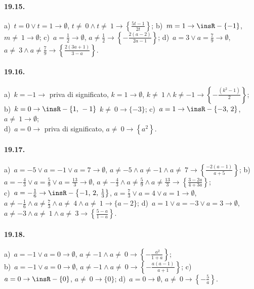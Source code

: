 \paragraph{19.15.}
a)~$t=0\vee t=1 \rightarrow \emptyset$, $t\neq~0\wedge t\neq~1 \rightarrow \left\{\frac{5t-1}{2t}\right\}$;
\quad b)~$m=1 \rightarrow \insR-\{-1\}$, $m\neq~1 \rightarrow \emptyset$;
\quad c)~$a=\frac{1}{2} \rightarrow \emptyset$, $a\neq \frac{1}{2} \rightarrow \left\{-{\frac{2(a-2)}{2a-1}}\right\}$;
\quad d)~$a=3\vee a=\frac{7}{9} \rightarrow \emptyset$, $a\neq~3\wedge a\neq \frac{7}{9} \rightarrow \left\{\frac{2(3a+1)}{3-a}\right\}$.

\paragraph{19.16.}
a)~$k=-1 \rightarrow$ priva di significato, $k=1 \rightarrow \emptyset$, $k\neq~1\wedge k\neq -1 \rightarrow \left\{-{\frac{\left(k^2-1\right)}{2}}\right\}$;
\protect\\ b)~$k=0 \rightarrow \insR-\{1\text{,~}-1\}$ $k\neq~0 \rightarrow \{-3\}$; \quad c)~$a=1 \rightarrow \insR-\{-3\text{,~}2\}$, $a\neq~1 \rightarrow \emptyset$;
\protect\\ d)~$a=0 \rightarrow$ priva di significato, $a\neq~0 \rightarrow \left\{a^{2}\right\}$.

\paragraph{19.17.}
a)~$a=-5\vee a=-1\vee a=7 \rightarrow \emptyset$, $a\neq -5\wedge a\neq -1\wedge a\neq~7 \rightarrow \left\{\frac{-2(a-1)}{a+5}\right\}$;
\quad b)~$a=-{\frac{4}{3}}\vee a=\frac{5}{9}\vee a=\frac{13}{3} \rightarrow \emptyset$, $a\neq -{\frac{4}{3}}\wedge a\neq \frac{5}{9}\wedge a\neq \frac{13}{3} \rightarrow \left\{\frac{3-2a}{4+3a}\right\}$;
\protect\\ c)~$a=-{\frac{1}{6}} \rightarrow \insR-\left\{-1\text{,~}2\text{,~}\frac{1}{3}\right\}$, $a=\frac{7}{3}\vee a=4\vee a=1 \rightarrow \emptyset$, $a\neq -{\frac{1}{6}}\wedge a\neq \frac{7}{3}\wedge a\neq~4\wedge a\neq~1 \rightarrow \{a-2\}$;
\quad d)~$a=1\vee a=-3\vee a=3 \rightarrow \emptyset$, $a\neq -3\wedge a\neq~1\wedge a\neq~3 \rightarrow \left\{\frac{5-a}{1-a}\right\}$.

\paragraph{19.18.}
a)~$a=-1\vee a=0 \rightarrow \emptyset$, $a\neq -1\wedge a\neq~0 \rightarrow \left\{-{\frac{\ a^{2}}{1+a}}\right\}$;
\protect\\ b)~$a=-1\vee a=0 \rightarrow \emptyset$, $a\neq -1\wedge a\neq~0 \rightarrow \left\{-{\frac{a(a-1)}{a+1}}\right\}$;
\quad c)~$a=0 \rightarrow \insR-\{0\}$, $a\neq~0 \rightarrow \{0\}$;
\quad d)~$a=0 \rightarrow \emptyset$, $a\neq~0 \rightarrow \left\{-{\frac{5}{a}}\right\}$.

